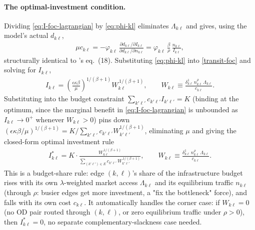 \documentclass[12pt, a4paper]{article}
\theoremstyle{definition}
\theoremstyle{remark}
\begin{document}
\paragraph{The optimal-investment condition.} Dividing \eqref{eq:I-foc-lagrangian} by \eqref{eq:phi-kl} eliminates $\Lambda_{k\ell}$ and gives, using the model's actual $d_{k\ell}$,
\begin{align}
    \label{transit-foc}
\mu c_{k\ell} = -\varphi_{k\ell}\,\frac{\partial d_{k\ell}/\partial I_{k\ell}}{\partial d_{k\ell}/\partial n_{k\ell}} = \varphi_{k\ell}\,\frac{\beta}{\rho}\,\frac{n_{k\ell}}{I_{k\ell}},
\end{align}
structurally identical to \citet{Bordeu2026-df}'s eq.~(18). Substituting \eqref{eq:phi-kl} into \eqref{transit-foc} and solving for $I_{k\ell}$,
\begin{align}
    \label{eq:I-given-mu}
I_{k\ell} = \left(\frac{\epsilon\kappa\beta}{\mu}\right)^{\!1/(\beta+1)} W_{k\ell}^{\,1/(\beta+1)}, \qquad W_{k\ell}\equiv\frac{\delta_{k\ell}^1\,n_{k\ell}^\rho\,\Lambda_{k\ell}}{c_{k\ell}}.
\end{align}
Substituting into the budget constraint $\sum_{k'\ell'}c_{k'\ell'}I_{k'\ell'}=K$ (binding at the optimum, since the marginal benefit in \eqref{eq:I-foc-lagrangian} is unbounded as $I_{k\ell}\to0^+$ whenever $W_{k\ell}>0$) pins down $(\epsilon\kappa\beta/\mu)^{1/(\beta+1)}=K/\sum_{k'\ell'}c_{k'\ell'}W_{k'\ell'}^{1/(\beta+1)}$, eliminating $\mu$ and giving the closed-form optimal investment rule
\begin{align}
    \label{eq:I-optimal}
I_{k\ell}^{*} = K\cdot\frac{W_{k\ell}^{\,1/(\beta+1)}}{\displaystyle\sum_{(k'\ell')\in E}c_{k'\ell'}\,W_{k'\ell'}^{\,1/(\beta+1)}}, \qquad W_{k\ell}\equiv\frac{\delta_{k\ell}^1\,n_{k\ell}^\rho\,\Lambda_{k\ell}}{c_{k\ell}}.
\end{align}
This is a budget-share rule: edge $(k,\ell)$'s share of the infrastructure budget rises with its own $\lambda$-weighted market access $\Lambda_{k\ell}$ and its equilibrium traffic $n_{k\ell}$ (through $\rho$: busier edges get more investment, a "fix the bottleneck" force), and falls with its own cost $c_{k\ell}$. It automatically handles the corner case: if $W_{k\ell}=0$ (no OD pair routed through $(k,\ell)$, or zero equilibrium traffic under $\rho>0$), then $I_{k\ell}^*=0$, no separate complementary-slackness case needed.
\end{document}
